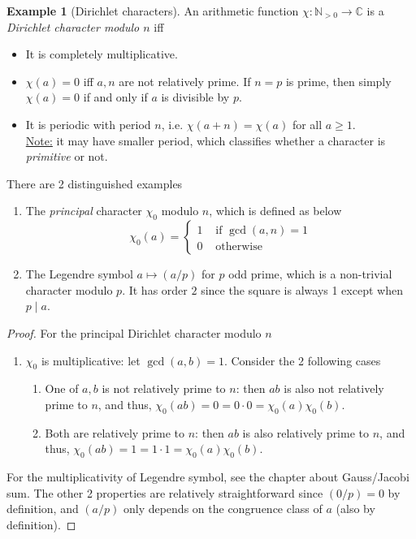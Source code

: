 \documentclass{article}
\theoremstyle{definition}
\newtheorem{example}[theorem]{Example}
\begin{document}
\begin{example}[Dirichlet characters]
An arithmetic function $\chi: \mathbb{N}_{> 0} \to \mathbb{C}$ is a \emph{Dirichlet character modulo $n$} iff
\begin{itemize}
	\item It is completely multiplicative.
	\item $\chi(a) = 0$ iff $a, n$ are not relatively prime. If $n = p$ is prime, then simply $\chi(a) = 0$ if and only if $a$ is divisible by $p$.
	\item It is periodic with period $n$, i.e. $\chi(a + n) = \chi(a)$ for all $a \geq 1$.
	\\
	\underline{Note:} it may have smaller period, which classifies whether a character is \emph{primitive} or not.
\end{itemize}
There are 2 distinguished examples
\begin{enumerate}
	\item The \emph{principal} character $\chi_0$ modulo $n$, which is defined as below
	$$\chi_0 (a) = \begin{cases}
		1 & \mbox{ if } \gcd(a, n) = 1 \\
		0 & \mbox{ otherwise}
	\end{cases}$$
	\item The Legendre symbol $a \mapsto (a/p)$ for $p$ odd prime, which is a non-trivial character modulo $p$. It has order $2$ since the square is always 1 except when $p \mid a$.
\end{enumerate}
\begin{proof}
For the principal Dirichlet character modulo $n$
\begin{enumerate}
	\item $\chi_0$ is multiplicative: let $\gcd(a, b) = 1$. Consider the 2 following cases
	\begin{enumerate}
		\item One of $a, b$ is not relatively prime to $n$: then $ab$ is also not relatively prime to $n$, and thus, $\chi_0 (ab) = 0 = 0 \cdot 0 = \chi_0 (a) \chi_0 (b)$. 
		\item Both are relatively prime to $n$: then $ab$ is also relatively prime to $n$, and thus, $\chi_0 (ab) = 1 = 1 \cdot 1 = \chi_0 (a) \chi_0 (b)$.
	\end{enumerate}
\end{enumerate}
For the multiplicativity of Legendre symbol, see the chapter about Gauss/Jacobi sum. The other 2 properties are relatively straightforward since $(0/p) = 0$ by definition, and $(a/p)$ only depends on the congruence class of $a$ (also by definition).
\end{proof}
\end{example}
\end{document}

